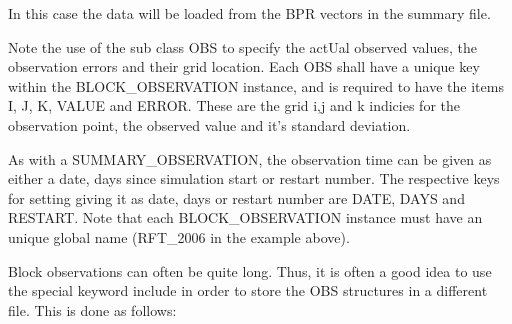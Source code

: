 \documentclass[a4paper,10pt,english]{sphinxmanual}
\begin{document}
%
\begin{sphinxVerbatim}[commandchars=\\\{\}]
 
     
      
     

                          
                          
                          
\end{sphinxVerbatim}

In this case the data will be loaded from the BPR vectors in the
summary file.

Note the use of the sub class OBS to specify the actUal observed
values, the observation errors and their grid location. Each OBS shall
have a unique key within the BLOCK\_OBSERVATION instance, and is
required to have the items I, J, K, VALUE and ERROR. These are the
grid i,j and k indicies for the observation point, the observed value
and it’s standard deviation.

As with a SUMMARY\_OBSERVATION, the observation time can be given as
either a date, days since simulation start or restart number. The
respective keys for setting giving it as date, days or restart number
are DATE, DAYS and RESTART. Note that each BLOCK\_OBSERVATION instance
must have an unique global name (RFT\_2006 in the example above).

Block observations can often be quite long. Thus, it is often a good
idea to use the special keyword include in order to store the OBS
structures in a different file. This is done as follows:
\end{document}
